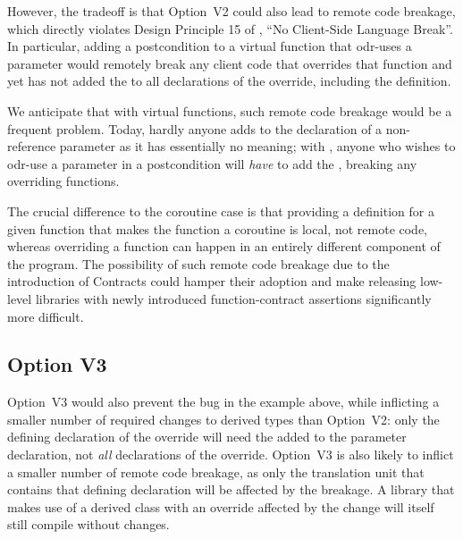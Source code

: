 However, the tradeoff is that Option~V2 could also lead to remote code breakage, which directly violates Design Principle 15 of \cite{P2900R10}, ``No Client-Side Language Break''. In particular, adding a postcondition to a virtual function that odr-uses a  parameter would remotely break any client code that overrides that function and yet has not added the  to all declarations of the override, including the definition.

We anticipate that with virtual functions, such remote code breakage would be a frequent problem. Today, hardly anyone adds  to the declaration of a non-reference parameter as it has essentially no meaning; with \cite{P2900R10}, anyone who wishes to odr-use a parameter in a postcondition will \emph{have} to add the , breaking any overriding functions.

The crucial difference to the coroutine case is that providing a definition for a given function that makes the function a coroutine is local, not remote code, whereas overriding a function can happen in an entirely different component of the program. The possibility of such remote code breakage due to the introduction of Contracts could hamper their adoption and make releasing low-level libraries with newly introduced function-contract assertions significantly more difficult.

\subsection*{Option V3}

Option~V3 would also prevent the bug in the example above, while inflicting a smaller number of required changes to derived types than Option~V2: only the defining declaration of the override will need the  added to the parameter declaration, not \emph{all} declarations of the override.
Option~V3 is also likely to inflict a smaller number of remote code breakage, as only the translation unit that contains that defining declaration will be affected by the breakage. A library that makes use of a derived class with an override affected by the change will itself still compile without changes.

